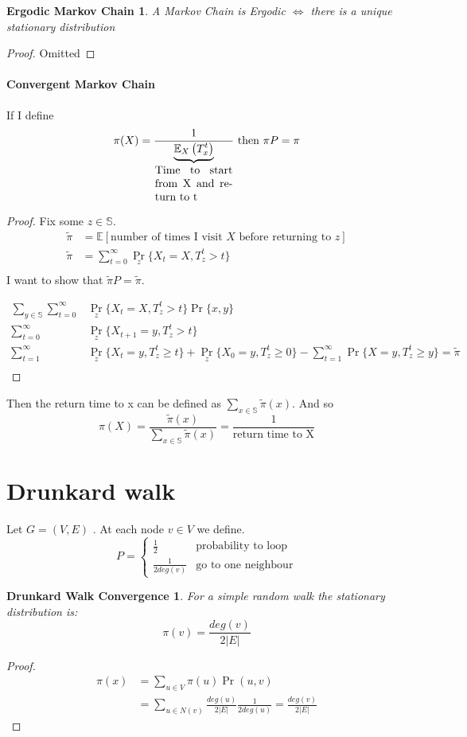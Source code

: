 \documentclass[]{article}
\begin{document}
\newtheorem{markov}{Ergodic Markov Chain}
\begin{markov}
	A Markov Chain is Ergodic $ \iff $ there is a unique stationary distribution
\end{markov}
\begin{proof}
	Omitted
\end{proof}

\paragraph{Convergent Markov Chain} If I define \[\pi(X) = \frac{1}{\underbrace{\mathbb{E}_X\left(T_x^t\right)}_{\parbox{7em}{Time to start from X and return to t}}} \text{ then } \pi P = \pi \]
\begin{proof}
Fix some $ z \in \mathbb{S} $.
\begin{align*}
\tilde{\pi} &= \mathbb{E}\left[\text{number of times I visit } X \text{ before returning to } z \right]\\
\tilde{\pi} &= \sum\limits_{t = 0}^{\infty} \Pr_z\{X_t = X, T_z^t > t\}\\
\end{align*}
I want to show that $ \tilde{\pi} P =  \tilde{\pi} $.

\begin{align*}
\sum\limits_{y \in \mathbb{S}} \sum\limits_{t = 0}^{\infty} &\Pr_z\{X_t = X, T_z^t > t\}\Pr\{x,y\}\\
\sum\limits_{t = 0}^{\infty} &\Pr_z\{X_{t+1} = y, T_z^t > t\}\\
\sum\limits_{t = 1}^{\infty} &\Pr_z\{X_{t} = y, T_z^t \geq t\} + \Pr_z\{X_{0} = y, T_z^t \geq 0\} - \sum\limits_{t = 1}^{\infty} \Pr\{X = y, T_z^t \geq y\} = \tilde{\pi}\\
\end{align*}
\end{proof}

Then the return time to x can be defined as $ \sum\limits_{x \in \mathbb{S}} \tilde{\pi}(x) $. And so \[\pi(X) = \frac{\tilde{\pi}(x)}{\sum\limits_{x \in \mathbb{S}} \tilde{\pi}(x)} = \frac{1}{\text{return time to X}}\]


\section{Drunkard walk} Let $ G = (V, E) $ . At each node $ v\in V $ we define.
\[
P = \begin{cases}
\frac{1}{2}&\text{probability to loop}\\
\frac{1}{2deg(v)}&\text{go to one neighbour}
\end{cases}
\]
\newtheorem{randomwalk}{Drunkard Walk Convergence}
\begin{randomwalk}
	For a simple random walk the stationary distribution is: \[
	\pi(v) = \frac{deg(v)}{2|E|}
	\]
\end{randomwalk}
\begin{proof}
	\begin{align*}
	\pi(x) &= \sum\limits_{u \in V} \pi(u)\Pr(u, v)\\
	& = \sum\limits_{u \in N(v)} \frac{deg(u)}{2|E|} \frac{1}{2deg(u)} =\frac{deg(v)}{2|E|}
	\end{align*}
\end{proof}
\end{document}
